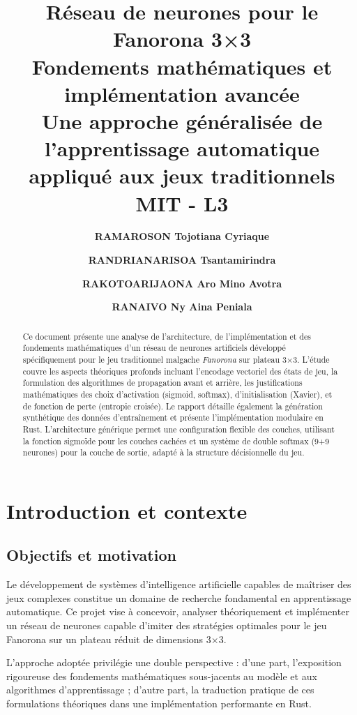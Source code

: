 \documentclass[12pt,a4paper]{report}
\title{
  \vspace{-2cm}
  {\color{primaryblue}\Huge\textbf{Réseau de neurones pour le Fanorona 3×3}}\\
  \vspace{0.5cm}
  {\color{secondarygreen}\Large Fondements mathématiques et implémentation avancée}\\
  \vspace{0.3cm}
  {\color{accentorange}\large Une approche généralisée de l'apprentissage automatique appliqué aux jeux traditionnels}\\
  \vspace{1.0cm}
  {\color{primaryblue}\large MIT - L3}
}
\author{
  \vspace{0.3cm}
  {\color{primaryblue}\textbf{RAMAROSON Tojotiana Cyriaque}} \and 
  \vspace{0.3cm}
  {\color{primaryblue}\textbf{RANDRIANARISOA Tsantamirindra}} \and 
  \vspace{0.3cm} 
  {\color{primaryblue}\textbf{RAKOTOARIJAONA Aro Mino Avotra}} \and
  \vspace{0.3cm} 
  {\color{primaryblue}\textbf{RANAIVO Ny Aina Peniala}}
}
\date{}
\numberwithin{equation}{section}
\begin{document}
\maketitle

\begin{abstract}
\color{black}
Ce document présente une analyse de l'architecture, de l'implémentation et des fondements mathématiques d'un réseau de neurones artificiels développé spécifiquement pour le jeu traditionnel malgache \emph{Fanorona} sur plateau 3×3. L'étude couvre les aspects théoriques profonds incluant l'encodage vectoriel des états de jeu, la formulation des algorithmes de propagation avant et arrière, les justifications mathématiques des choix d'activation (sigmoid, softmax), d'initialisation (Xavier), et de fonction de perte (entropie croisée). Le rapport détaille également la génération synthétique des données d'entraînement et présente l'implémentation modulaire en Rust. L'architecture générique permet une configuration flexible des couches, utilisant la fonction sigmoïde pour les couches cachées et un système de double softmax (9+9 neurones) pour la couche de sortie, adapté à la structure décisionnelle du jeu.
\end{abstract}

\clearpage
\tableofcontents
\clearpage
{}

\chapter{Introduction et contexte}

\section{Objectifs et motivation}
Le développement de systèmes d'intelligence artificielle capables de maîtriser des jeux complexes constitue un domaine de recherche fondamental en apprentissage automatique. Ce projet vise à concevoir, analyser théoriquement et implémenter un réseau de neurones capable d'imiter des stratégies optimales pour le jeu Fanorona sur un plateau réduit de dimensions 3×3.

\begin{important}
L'approche adoptée privilégie une double perspective : d'une part, l'exposition rigoureuse des fondements mathématiques sous-jacents au modèle et aux algorithmes d'apprentissage ; d'autre part, la traduction pratique de ces formulations théoriques dans une implémentation performante en Rust.
\end{important}
\end{document}
